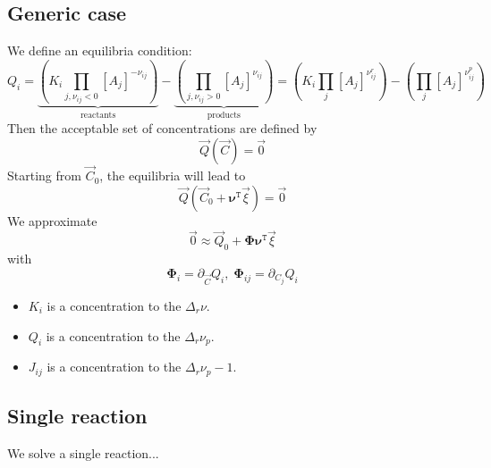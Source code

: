 \documentclass[aps,12pt]{revtex4}
\newcommand{\trn}[1]{{#1}^{\mathtt{T}}}
\newcommand{\conc}[1]{{\left[#1\right]}}
\begin{document}
\subsection{Generic case}
We define an equilibria condition:
\begin{equation}
	Q_i =  \underbrace{\left(K_i \prod_{j,\nu_{ij}<0} \conc{A_j}^{-\nu_{ij}}\right)}_{\text{reactants}} 
	- \underbrace{\left( \prod_{j,\nu_{ij}>0} \conc{A_j}^{\nu_{ij}}\right)}_{\text{products}}
	= \left(K_i \prod_{j} \conc{A_j}^{\nu^r_{ij}}\right)
	- \left( \prod_{j} \conc{A_j}^{\nu^p_{ij}}\right)  
\end{equation}
Then the acceptable set of concentrations are defined by
\begin{equation}
	\vec{Q}(\vec{C}) = \vec{0}
\end{equation}
Starting from $\vec{C}_0$, the equilibria will lead to
\begin{equation}
	\vec{Q}(\vec{C}_0+\trn{\bm{\nu}} \vec{\xi}) = \vec{0}
\end{equation}
We approximate
\begin{equation}
	\vec{0} \approx \vec{Q}_0 + \bm{\Phi} \trn{\bm{\nu}} \vec{\xi}
\end{equation}
with
\begin{equation}
	\bm{\Phi}_i = \partial_{\vec{C}} Q_i,\; \bm{\Phi}_{ij}= \partial_{C_j} Q_i
\end{equation}

\begin{itemize}
\item $K_i$ is a concentration to the $\Delta_r \nu$.
\item $Q_i$ is a concentration to the $\Delta_r \nu_p$.
\item $J_{ij}$ is a concentration to the $\Delta_r \nu_p-1$.
\end{itemize}

\subsection{Single reaction}
We solve a single reaction...
\end{document}
